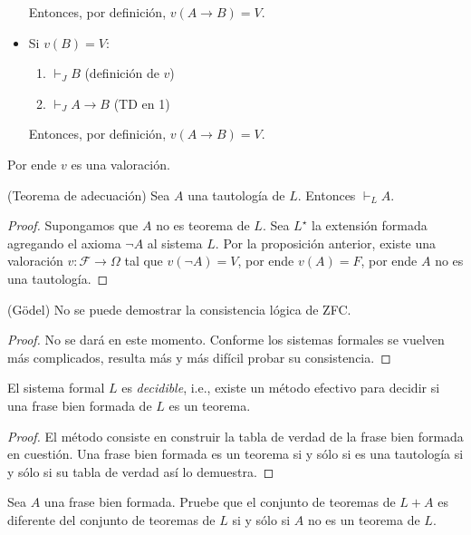 \begin{prove}
\begin{itemize}
    Entonces, por definición, $v(A \to B) = V$.

    \item Si $v(B) = V$:
    \begin{enumerate}
        \item $\vdash_J B$       \hfill (definición de $v$)
        \item $\vdash_J A \to B$ \hfill (TD en 1)
    \end{enumerate}
    
    Entonces, por definición, $v(A \to B) = V$.
\end{itemize}

Por ende $v$ es una valoración.
\end{prove}

\begin{proposition}
(Teorema de adecuación) Sea $A$ una tautología de $L$. Entonces $\vdash_L A$.
\end{proposition}

\begin{proof}
Supongamos que $A$ no es teorema de $L$. Sea $L^\star$ la extensión formada agregando el axioma $\neg A$ al sistema $L$. Por la proposición anterior, existe una valoración $v : \mathscr F \to \Omega$ tal que $v(\neg A) = V$, por ende $v(A) = F$, por ende $A$ no es una tautología.
\end{proof}

\begin{proposition}
(Gödel) No se puede demostrar la consistencia lógica de ZFC.
\end{proposition}

\begin{proof}
No se dará en este momento. Conforme los sistemas formales se vuelven más complicados, resulta más y más difícil probar su consistencia.
\end{proof}

\begin{proposition}
El sistema formal $L$ es \textit{decidible}, i.e., existe un método efectivo para decidir si una frase bien formada de $L$ es un teorema.
\end{proposition}

\begin{proof}
El método consiste en construir la tabla de verdad de la frase bien formada en cuestión. Una frase bien formada es un teorema si y sólo si es una tautología si y sólo si su tabla de verdad así lo demuestra.
\end{proof}

\begin{exercise}
Sea $A$ una frase bien formada. Pruebe que el conjunto de teoremas de $L+A$ es diferente del conjunto de teoremas de $L$ si y sólo si $A$ no es un teorema de $L$.
\end{exercise}

